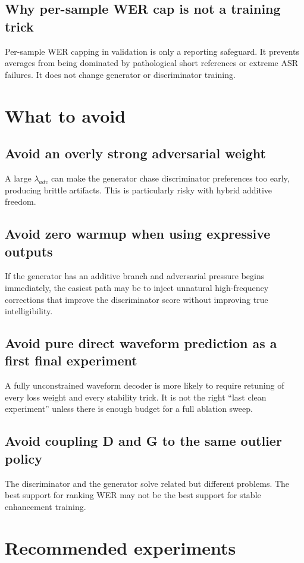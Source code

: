 \documentclass[11pt]{article}
\begin{document}
\subsection{Why per-sample WER cap is not a training trick}
Per-sample WER capping in validation is only a reporting safeguard. It prevents averages from being dominated by pathological short references or extreme ASR failures. It does not change generator or discriminator training.

\section{What to avoid}
\subsection{Avoid an overly strong adversarial weight}
A large $\lambda_{adv}$ can make the generator chase discriminator preferences too early, producing brittle artifacts. This is particularly risky with hybrid additive freedom.

\subsection{Avoid zero warmup when using expressive outputs}
If the generator has an additive branch and adversarial pressure begins immediately, the easiest path may be to inject unnatural high-frequency corrections that improve the discriminator score without improving true intelligibility.

\subsection{Avoid pure direct waveform prediction as a first final experiment}
A fully unconstrained waveform decoder is more likely to require retuning of every loss weight and every stability trick. It is not the right ``last clean experiment'' unless there is enough budget for a full ablation sweep.

\subsection{Avoid coupling D and G to the same outlier policy}
The discriminator and the generator solve related but different problems. The best support for ranking WER may not be the best support for stable enhancement training.

\section{Recommended experiments}
\end{document}
